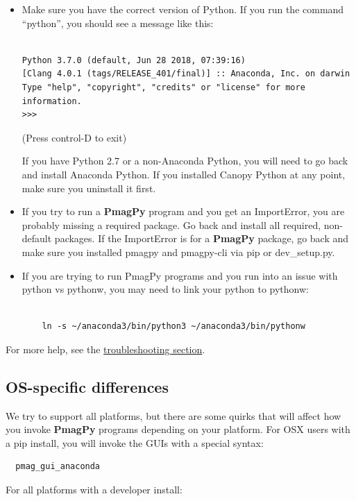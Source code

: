 \documentclass[11pt]{book}
\begin{document}
{\begin{itemize}
\item Make sure you have the correct version of Python.  If you run the command ``python'', you should see a message like this:

\begin{verbatim}

Python 3.7.0 (default, Jun 28 2018, 07:39:16)
[Clang 4.0.1 (tags/RELEASE_401/final)] :: Anaconda, Inc. on darwin
Type "help", "copyright", "credits" or "license" for more information.
>>>
\end{verbatim}
(Press control-D to exit)

If you have Python 2.7 or a non-Anaconda Python, you will need to go back and install Anaconda Python.  If you installed Canopy Python at any point, make sure you uninstall it first.


\item If you try to run a {\bf PmagPy} program and you get an ImportError, you are probably missing a required package.  Go back and install all required, non-default packages.  If the ImportError is for a {\bf PmagPy} package, go back and make sure you installed pmagpy and pmagpy-cli via pip or dev\_setup.py.

\item If you are trying to run PmagPy programs and you run into an issue with python vs pythonw, you may need to link your python to pythonw:
  \begin{verbatim}

    ln -s ~/anaconda3/bin/python3 ~/anaconda3/bin/pythonw

    \end{verbatim}

\end{itemize}

For more help, see the \href{#trouble}{troubleshooting section}.

    \subsection {OS-specific differences}
    We try to support all platforms, but there are some quirks that will affect how you invoke {\bf PmagPy} programs depending on your platform.  For OSX users with a pip install, you will invoke the GUIs with a special syntax:

\begin{verbatim}
  pmag_gui_anaconda
\end{verbatim}

For all platforms with a developer install:

}
\end{document}

